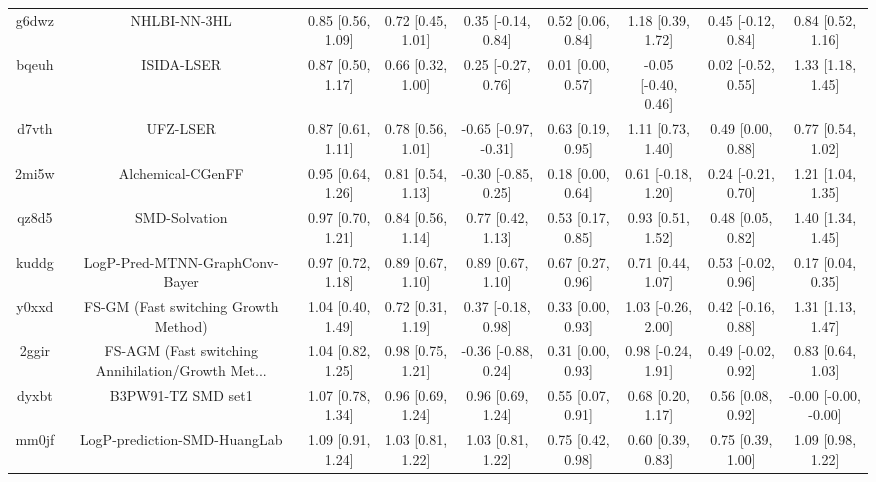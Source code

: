 \documentclass{article}
\begin{document}
\begin{center}
\begin{longtable}{|ccccccccc|}
 g6dwz &                                       NHLBI-NN-3HL &  0.85 [0.56, 1.09] &  0.72 [0.45, 1.01] &    0.35 [-0.14, 0.84] &  0.52 [0.06, 0.84] &    1.18 [0.39, 1.72] &   0.45 [-0.12, 0.84] &     0.84 [0.52, 1.16] \\
 bqeuh &                                         ISIDA-LSER &  0.87 [0.50, 1.17] &  0.66 [0.32, 1.00] &    0.25 [-0.27, 0.76] &  0.01 [0.00, 0.57] &  -0.05 [-0.40, 0.46] &   0.02 [-0.52, 0.55] &     1.33 [1.18, 1.45] \\
 d7vth &                                           UFZ-LSER &  0.87 [0.61, 1.11] &  0.78 [0.56, 1.01] &  -0.65 [-0.97, -0.31] &  0.63 [0.19, 0.95] &    1.11 [0.73, 1.40] &    0.49 [0.00, 0.88] &     0.77 [0.54, 1.02] \\
 2mi5w &                                  Alchemical-CGenFF &  0.95 [0.64, 1.26] &  0.81 [0.54, 1.13] &   -0.30 [-0.85, 0.25] &  0.18 [0.00, 0.64] &   0.61 [-0.18, 1.20] &   0.24 [-0.21, 0.70] &     1.21 [1.04, 1.35] \\
 qz8d5 &                                      SMD-Solvation &  0.97 [0.70, 1.21] &  0.84 [0.56, 1.14] &     0.77 [0.42, 1.13] &  0.53 [0.17, 0.85] &    0.93 [0.51, 1.52] &    0.48 [0.05, 0.82] &     1.40 [1.34, 1.45] \\
 kuddg &                     LogP-Pred-MTNN-GraphConv-Bayer &  0.97 [0.72, 1.18] &  0.89 [0.67, 1.10] &     0.89 [0.67, 1.10] &  0.67 [0.27, 0.96] &    0.71 [0.44, 1.07] &   0.53 [-0.02, 0.96] &     0.17 [0.04, 0.35] \\
 y0xxd &               FS-GM (Fast switching Growth Method) &  1.04 [0.40, 1.49] &  0.72 [0.31, 1.19] &    0.37 [-0.18, 0.98] &  0.33 [0.00, 0.93] &   1.03 [-0.26, 2.00] &   0.42 [-0.16, 0.88] &     1.31 [1.13, 1.47] \\
 2ggir &  FS-AGM (Fast switching Annihilation/Growth Met... &  1.04 [0.82, 1.25] &  0.98 [0.75, 1.21] &   -0.36 [-0.88, 0.24] &  0.31 [0.00, 0.93] &   0.98 [-0.24, 1.91] &   0.49 [-0.02, 0.92] &     0.83 [0.64, 1.03] \\
 dyxbt &                                 B3PW91-TZ SMD set1 &  1.07 [0.78, 1.34] &  0.96 [0.69, 1.24] &     0.96 [0.69, 1.24] &  0.55 [0.07, 0.91] &    0.68 [0.20, 1.17] &    0.56 [0.08, 0.92] &  -0.00 [-0.00, -0.00] \\
 mm0jf &                       LogP-prediction-SMD-HuangLab &  1.09 [0.91, 1.24] &  1.03 [0.81, 1.22] &     1.03 [0.81, 1.22] &  0.75 [0.42, 0.98] &    0.60 [0.39, 0.83] &    0.75 [0.39, 1.00] &     1.09 [0.98, 1.22] \\

\end{longtable}
\end{center}
\end{document}
